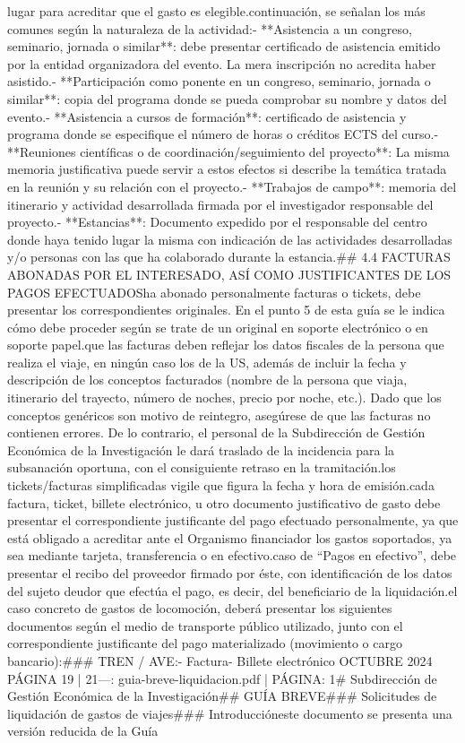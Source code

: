 \documentclass{article}
\begin{document}
\begin{itemize}
{lugar para acreditar que el gasto es elegible.\n\nA continuación, se señalan los más comunes según la naturaleza de la actividad:\n\n- **Asistencia a un congreso, seminario, jornada o similar**: debe presentar certificado de asistencia emitido por la entidad organizadora del evento. La mera inscripción no acredita haber asistido.\n- **Participación como ponente en un congreso, seminario, jornada o similar**: copia del programa donde se pueda comprobar su nombre y datos del evento.\n- **Asistencia a cursos de formación**: certificado de asistencia y programa donde se especifique el número de horas o créditos ECTS del curso.\n- **Reuniones científicas o de coordinación/seguimiento del proyecto**: La misma memoria justificativa puede servir a estos efectos si describe la temática tratada en la reunión y su relación con el proyecto.\n- **Trabajos de campo**: memoria del itinerario y actividad desarrollada firmada por el investigador responsable del proyecto.\n- **Estancias**: Documento expedido por el responsable del centro donde haya tenido lugar la misma con indicación de las actividades desarrolladas y/o personas con las que ha colaborado durante la estancia.\n\n## 4.4 FACTURAS ABONADAS POR EL INTERESADO, ASÍ COMO JUSTIFICANTES DE LOS PAGOS EFECTUADOS\n\nSi ha abonado personalmente facturas o tickets, debe presentar los correspondientes originales. En el punto 5 de esta guía se le indica cómo debe proceder según se trate de un original en soporte electrónico o en soporte papel.\n\nRecuerde que las facturas deben reflejar los datos fiscales de la persona que realiza el viaje, en ningún caso los de la US, además de incluir la fecha y descripción de los conceptos facturados (nombre de la persona que viaja, itinerario del trayecto, número de noches, precio por noche, etc.). Dado que los conceptos genéricos son motivo de reintegro, asegúrese de que las facturas no contienen errores. De lo contrario, el personal de la Subdirección de Gestión Económica de la Investigación le dará traslado de la incidencia para la subsanación oportuna, con el consiguiente retraso en la tramitación.\n\nEn los tickets/facturas simplificadas vigile que figura la fecha y hora de emisión.\n\nPor cada factura, ticket, billete electrónico, u otro documento justificativo de gasto debe presentar el correspondiente justificante del pago efectuado personalmente, ya que está obligado a acreditar ante el Organismo financiador los gastos soportados, ya sea mediante tarjeta, transferencia o en efectivo.\n\nEn caso de “Pagos en efectivo”, debe presentar el recibo del proveedor firmado por éste, con identificación de los datos del sujeto deudor que efectúa el pago, es decir, del beneficiario de la liquidación.\n\nEn el caso concreto de gastos de locomoción, deberá presentar los siguientes documentos según el medio de transporte público utilizado, junto con el correspondiente justificante del pago materializado (movimiento o cargo bancario):\n\n### TREN / AVE:\n\n- Factura\n- Billete electrónico\n{} OCTUBRE 2024    PÁGINA 19 | 21\n\n---\n\nFUENTE: guia-breve-liquidacion.pdf | PÁGINA: 1\n# Subdirección de Gestión Económica de la Investigación\n\n## GUÍA BREVE\n### Solicitudes de liquidación de gastos de viajes\n\n### Introducción\n\nEn este documento se presenta una versión reducida de la Guía }
\end{itemize}
\end{document}
